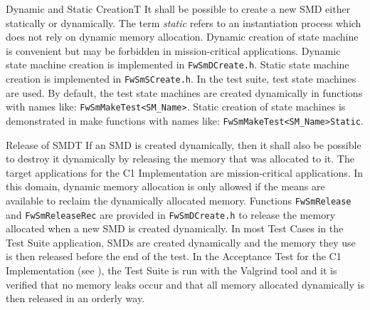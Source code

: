 \documentclass[requirements]{../fwprofile}
\begin{document}
\begin{fw_req_note}{Dynamic and Static Creation}{T}
{ It shall be possible to create a new SMD either statically or dynamically.}
{The term \emph{static} refers to an instantiation process which does not rely on dynamic memory
allocation.}
{Dynamic creation of state machine is convenient but may be forbidden in mission-critical applications.}
{Dynamic state machine creation is implemented in \texttt{FwSmDCreate.h}. Static state machine 
creation is implemented in \texttt{FwSmSCreate.h}.} 
{In the test suite, test state machines are used. By default, the test state machines are created dynamically in functions with names like: \texttt{FwSmMakeTest<SM\_Name>}. 
Static creation of state machines is demonstrated in make functions with names like: \texttt{FwSmMakeTest<SM\_Name>Static}.}
\end{fw_req_note}


\begin{fw_req}{Release of SMD}{T}
{If an SMD is created dynamically, then it shall also be possible to destroy it dynamically by releasing the memory 
that was allocated to it.}
{The target applications for the C1 Implementation are mission-critical applications. In this domain, dynamic 
memory allocation is only allowed if the means are available to reclaim the dynamically allocated memory.}
{Functions \texttt{FwSmRelease} and \texttt{FwSmReleaseRec} are provided in \texttt{FwSmDCreate.h} to release 
the memory allocated when a new SMD is created dynamically.} 
{In most Test Cases in the  Test Suite application, SMDs are created dynamically and the memory they use is then released before the end of the test. 
In the Acceptance Test for the C1 Implementation (see \cite{ref:um}), the Test Suite is run 
with the Valgrind tool and it is verified that no memory leaks occur and 
that all memory allocated dynamically is then released in an orderly way.}
\end{fw_req}
\end{document}
